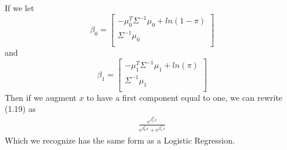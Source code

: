 \documentclass[paper=a4, fontsize=11pt]{scrartcl} %
\numberwithin{equation}{section} %
\numberwithin{figure}{section} %
\numberwithin{table}{section} %
\begin{document}
	If we let
	\begin{equation}
	\beta_0=\begin{bmatrix}
	 -\mu_0^T\Sigma^{-1}\mu_0 + ln(1-\pi)\\
	\Sigma^{-1}\mu_0 \\
	\end{bmatrix}
	\end{equation}
	and
	\begin{equation}
	\beta_1=\begin{bmatrix}
	-\mu_1^T\Sigma^{-1}\mu_1 + ln(\pi)\\
	\Sigma^{-1}\mu_1 \\
	\end{bmatrix}
	\end{equation}
	Then if we augment \(x\) to have a first component equal to one, we can rewrite (1.19) as
	\begin{align}
	\frac{e^{\beta_1^Tx}}{e^{\beta_0^Tx}+e^{\beta_1^Tx}}
	\end{align}
	Which we recognize has the same form as a Logistic Regression.
	
\end{document}
